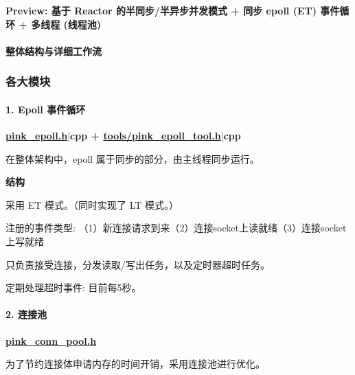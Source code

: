 {\bfseries Preview\+: 基于 Reactor 的半同步/半异步并发模式 + 同步 epoll (ET) 事件循环 + 多线程 (线程池)} 



\paragraph*{整体结构与详细工作流}

 



\subsubsection*{各大模块}

\paragraph*{1. Epoll 事件循环}

{\bfseries \hyperlink{pink__epoll_8h}{pink\+\_\+epoll.\+h}$\vert$cpp + \hyperlink{pink__epoll__tool_8h}{tools/pink\+\_\+epoll\+\_\+tool.\+h}$\vert$cpp}

在整体架构中，epoll 属于同步的部分，由主线程同步运行。


\begin{DoxyItemize}
\item {\bfseries 结构}
\end{DoxyItemize}
\begin{DoxyEnumerate}
\item 采用 ET 模式。（同时实现了 LT 模式。）
\item 注册的事件类型\+: （1）新连接请求到来（2）连接socket上读就绪（3）连接socket上写就绪
\item 只负责接受连接，分发读取/写出任务，以及定时器超时任务。
\item 定期处理超时事件\+: 目前每5秒。
\end{DoxyEnumerate}

\paragraph*{2. 连接池}

{\bfseries \hyperlink{pink__conn__pool_8h}{pink\+\_\+conn\+\_\+pool.\+h}}

为了节约连接体申请内存的时间开销，采用连接池进行优化。



